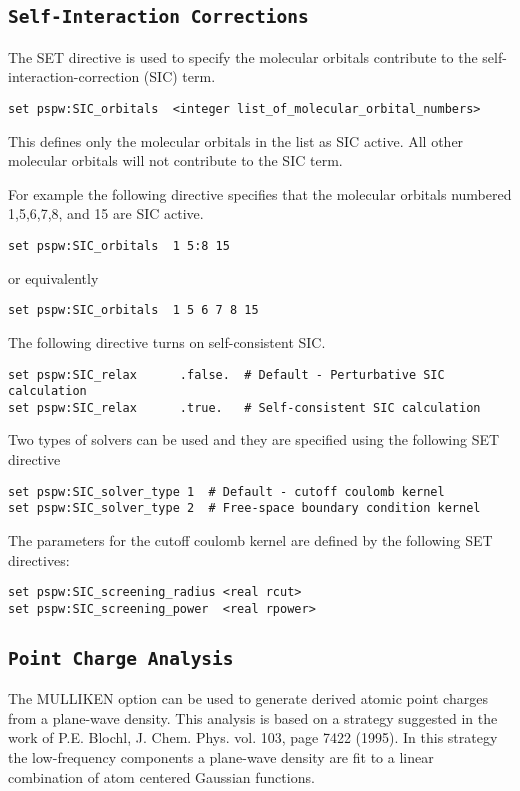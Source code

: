 \subsection{\tt Self-Interaction Corrections}
\label{sec:pspw_SIC}

The SET directive is used to specify the molecular orbitals 
contribute to the self-interaction-correction (SIC) term.
\begin{verbatim}
set pspw:SIC_orbitals  <integer list_of_molecular_orbital_numbers>
\end{verbatim}
This defines only the molecular orbitals in the list as SIC active.  All
other molecular orbitals will not contribute to the SIC term.

For example the following directive specifies that the molecular orbitals numbered
1,5,6,7,8, and 15 are SIC active.
\begin{verbatim}
set pspw:SIC_orbitals  1 5:8 15
\end{verbatim}
or equivalently
\begin{verbatim}
set pspw:SIC_orbitals  1 5 6 7 8 15
\end{verbatim}

The following directive turns on self-consistent SIC.
\begin{verbatim}
set pspw:SIC_relax      .false.  # Default - Perturbative SIC calculation
set pspw:SIC_relax      .true.   # Self-consistent SIC calculation
\end{verbatim}

Two types of solvers can be used and they are specified using the following
SET directive
\begin{verbatim}
set pspw:SIC_solver_type 1  # Default - cutoff coulomb kernel
set pspw:SIC_solver_type 2  # Free-space boundary condition kernel
\end{verbatim}
The parameters for the cutoff coulomb kernel are defined by the following
SET directives:
\begin{verbatim}
set pspw:SIC_screening_radius <real rcut>
set pspw:SIC_screening_power  <real rpower>
\end{verbatim}



\subsection{\tt Point Charge Analysis}
\label{sec:pspw_point_charge_analysis}

The MULLIKEN option can be used to generate derived atomic point charges
from a plane-wave density.  This analysis is based on a strategy suggested in the work of
P.E. Blochl, J. Chem. Phys. vol. 103, page 7422 (1995).  In this strategy
the low-frequency components a plane-wave density are fit to a linear
combination of atom centered Gaussian functions.


